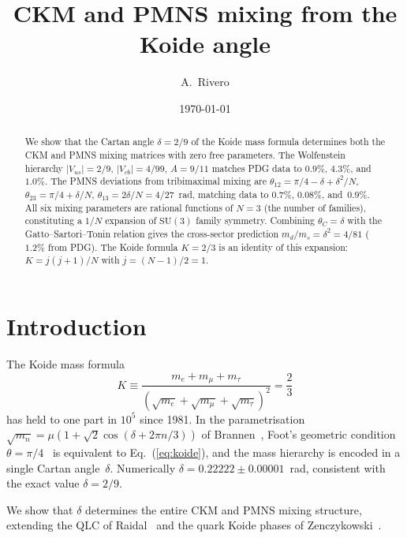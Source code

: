 \documentclass[aps,prl,twocolumn,showpacs,preprintnumbers]{revtex4-2}
\newcommand{\SU}{\mathrm{SU}}
\begin{document}
\title{CKM and PMNS mixing from the Koide angle}

\author{A.\ Rivero}

\date{\today}

\begin{abstract}
We show that the Cartan angle $\delta = 2/9$ of the Koide
mass formula determines both the CKM and PMNS mixing matrices
with zero free parameters.
The Wolfenstein hierarchy $|V_{us}| = 2/9$,
$|V_{cb}| = 4/99$, $A = 9/11$ matches PDG data to
$0.9\%$, $4.3\%$, and~$1.0\%$.
The PMNS deviations from tribimaximal mixing are
$\theta_{12} = \pi/4 - \delta + \delta^2/N$,
$\theta_{23} = \pi/4 + \delta/N$,
$\theta_{13} = 2\delta/N = 4/27$~rad,
matching data to $0.7\%$, $0.08\%$, and~$0.9\%$.
All six mixing parameters are rational functions of $N = 3$
(the number of families), constituting a $1/N$ expansion
of $\SU(3)$ family symmetry.
Combining $\theta_C = \delta$ with the Gatto--Sartori--Tonin relation
gives the cross-sector prediction $m_d/m_s = \delta^2 = 4/81$ ($1.2\%$
from PDG).
The Koide formula $K = 2/3$ is an identity of
this expansion: $K = j(j{+}1)/N$ with $j = (N{-}1)/2 = 1$.
\end{abstract}

\maketitle

\section{Introduction}

The Koide mass formula~\cite{Koide:1983}
\begin{equation}
  K \equiv \frac{m_e + m_\mu + m_\tau}{(\sqrt{m_e}+\sqrt{m_\mu}+\sqrt{m_\tau})^2}
  = \frac{2}{3}
  \label{eq:koide}
\end{equation}
has held to one part in $10^5$ since 1981.
In the parametrisation $\sqrt{m_n} = \mu(1+\sqrt{2}\cos(\delta+2\pi n/3))$
of Brannen~\cite{Brannen:2006}, Foot's geometric
condition~$\theta = \pi/4$~\cite{Foot:1994} is equivalent to
Eq.~(\ref{eq:koide}), and the mass hierarchy is encoded in a
single Cartan angle~$\delta$.
Numerically $\delta = 0.22222 \pm 0.00001$~rad,
consistent with the exact value $\delta = 2/9$.

We show that $\delta$ determines the entire CKM and PMNS mixing
structure, extending the QLC of Raidal~\cite{Raidal:2004}
and the quark Koide phases of
Zenczykowski~\cite{Zenczykowski:2012}.
\end{document}
